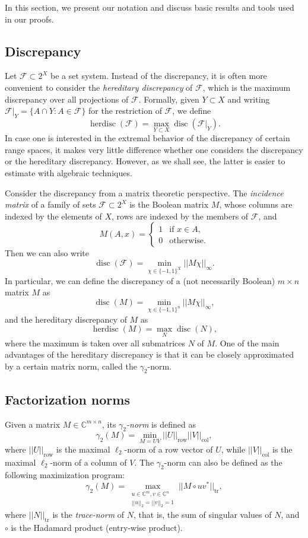 \documentclass[11pt]{article}
\theoremstyle{plain}
\theoremstyle{definition}
\DeclareMathOperator{\disc}{disc}
\DeclareMathOperator{\herdisc}{herdisc}
\begin{document}
	In this section, we present our notation and discuss basic results and tools used in our proofs.
	
	\subsection{Discrepancy}
	
	Let $\mathcal{F}\subset 2^X$ be a set system. Instead of the discrepancy, it is often more convenient to consider the \emph{hereditary discrepancy} of $\mathcal{F}$, which is the maximum discrepancy over all projections of $\mathcal{F}$. Formally, given $Y\subset X$ and writing $\mathcal{F}|_{Y}=\{A\cap Y:A\in \mathcal{F}\}$ for the restriction of $\mathcal F$, we define
	$$\herdisc(\mathcal{F})=\max_{Y\subset X}\disc(\mathcal{F}|_Y).$$
	In case one is interested in the extremal behavior of the discrepancy of certain range spaces, it makes very little difference whether one considers the discrepancy or the hereditary discrepancy. However, as we shall see, the latter is easier to estimate with algebraic techniques.
	
	Consider the discrepancy from a matrix theoretic perspective. The \emph{incidence matrix} of a family of sets $\mathcal{F}\subset 2^X$ is the Boolean matrix $M$, whose columns are indexed by the elements of $X$, rows are indexed by the members of $\mathcal{F}$, and 
	$$M(A,x)=\begin{cases}1&\text{if }x\in A,\\
		0&\text{otherwise.}\end{cases}$$
	Then we can also write
	$$\disc(\mathcal{F})=\min_{\chi\in \{-1,1\}^X} ||M\chi||_{\infty}.$$
	In particular, we can define the discrepancy of a (not necessarily Boolean) $m\times n$ matrix $M$ as
	$$\disc(M)=\min_{\chi\in \{-1,1\}^n} ||M\chi||_{\infty},$$
	and the hereditary discrepancy of $M$ as
	$$\herdisc(M)=\max_{N}\disc(N),$$
	where the maximum is taken over all submatrices $N$ of $M$. One of the main advantages of the hereditary discrepancy is that it can be closely approximated by a certain matrix norm, called the $\gamma_2$-norm.
	
	\subsection{Factorization norms}
	
	Given a matrix $M\in \mathbb{C}^{m\times n}$, its \emph{$\gamma_2$-norm} is defined as
	$$\gamma_2(M)=\min_{M=UV} ||U||_{\text{row}}||V||_{\text{col}},$$
	where $||U||_{\text{row}}$ is the maximal $\ell_2$-norm of a row vector of $U$, while $||V||_{\text{col}}$ is the maximal $\ell_2$-norm of a column of $V$. The $\gamma_2$-norm can also be defined as the following maximization program:
	$$\gamma_2(M)=\max_{\substack{u\in \mathbb{C}^m, v\in \mathbb{C}^n\\ ||u||_2=||v||_2=1}} ||M\circ uv^*||_{\text{tr}},$$
	where $||N||_{\text{tr}}$ is the \emph{trace-norm} of $N$, that is, the sum of singular values of $N$, and $\circ$ is the Hadamard product (entry-wise product). 
	
\end{document}
